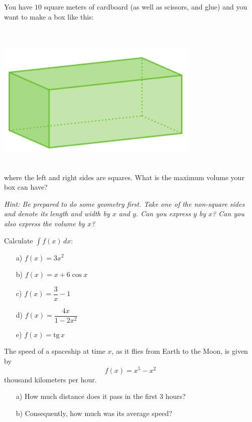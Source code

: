 \begin{problem}
You have $10$ square meters of cardboard (as well as scissors, and glue) and you want to make a box like this:
\begin{center}
\\~\\
\includegraphics[width=0.4\linewidth]{figs/top-ov-box.png}
\\~\\
\end{center}
where the left and right sides are squares. What is the maximum volume your box can have?



\smallskip 

{\small \textit{Hint:  Be prepared to do some geometry first. Take one of the non-square sides and denote its length and width by $x$ and $y$. Can you express $y$ by $x$? Can you also express the volume by $x$?}
    }


\end{problem}



\medskip

\begin{problem}
    Calculate $\displaystyle \int f(x)\, dx$:
    \begin{enumerate}
        \item[a) ] $f(x)=3x^2$
        \item[b) ] $f(x)=x+6\cos x$
        \item[c) ] $f(x)=\dfrac{3}{x}-1$
        \item[d) ] $f(x)=\dfrac{4x}{1-2x^2}$
        \item[e) ] $f(x)=\text{tg}\,x$
    \end{enumerate}
\end{problem}

\medskip



\begin{problem}
The speed of a spaceship  at time $x$, as it flies from Earth to the Moon, is given by \[f(x) = x^5-x^2\] 
thousand kilometers per hour.
    \begin{enumerate}
        \item[a) ] How much distance does it pass in the first $3$ hours?

        \item[b) ] Consequently, how much was its average speed?  
    \end{enumerate}
\end{problem}

